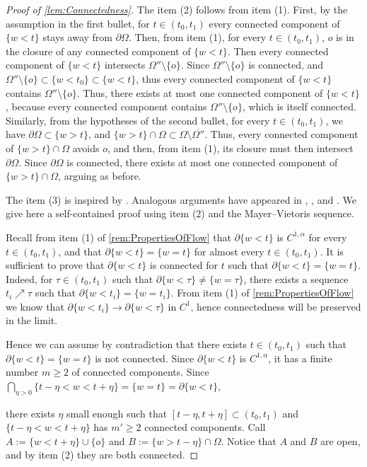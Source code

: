 \documentclass[a4paper,12pt,reqno]{amsart}
\numberwithin{equation}{section}
\theoremstyle{plain}
\theoremstyle{definition}
\theoremstyle{remark}
\begin{document}
{\begin{proof}[Proof of \cref{lem:Connectedness}]
         The item (2) follows from item (1). First, by the assumption in the first bullet, for $t \in (t_0, t_1)$ every connected component of $\{w<t\}$ stays away from $\partial\Omega$. Then, from item (1), for every $t\in (t_0,t_1)$, $o$ is in the closure of any connected component of $\{w<t\}$. Then every connected component of $\{w<t\}$ intersects $\Omega''\setminus\{o\}$. Since $\Omega''\setminus\{o\}$ is connected, and $\Omega''\setminus\{o\}\subset \{w<t_0\}\subset \{w<t\}$, thus every connected component of $\{w<t\}$ contains $\Omega''\setminus\{o\}$. Thus, there exists at most one connected component of $\{w<t\}$, because every connected component contains $\Omega''\setminus\{o\}$, which is itself connected. Similarly, from the hypotheses of the second bullet, for every $t\in (t_0,t_1)$, we have $\partial\Omega\subset\{w>t\}$, and $\{w>t\}\cap\Omega\subset\Omega\setminus\overline{\Omega''}$. Thus, every connected component of $\{w>t\}\cap\Omega$ avoids $o$, and then, from item (1), its closure must then intersect $\partial\Omega$. Since $\partial\Omega$ is connected, there exists at most one connected component of $\{w>t\}\cap\Omega$, arguing as before.

         The item (3) is inspired by \cite[Connectedness Lemma 4.2(ii)]{HuiskenIlmanen}. Analogous arguments have appeared in \cite[Lemma 2.3]{MunteanuWang}, \cite[Lemma 6.1]{JDGLiTam}, and \cite[Lemma 4.46]{LeeBook}. We give here a self-contained proof using item (2) and the Mayer--Vietoris sequence. 

        {Recall from item (1) of \cref{rem:PropertiesOfFlow} that $\partial\{w<t\}$ is $C^{1,\alpha}$ for every $t \in (t_0,t_1)$, and that $\partial \{w<t\} = \{w=t\}$ for almost every $t \in (t_0,t_1)$. It is sufficient to prove that $\partial \{w<t\}$ is connected for $t$ such that $\partial \{w<t\} = \{w=t\}$. Indeed, for $\tau \in (t_0,t_1)$ such that $\partial \{w<\tau\} \neq \{w=\tau\}$, there exists a sequence $t_i\nearrow \tau$ such that $\partial \{w<t_i\} = \{w=t_i\}$. From item (1) of \cref{rem:PropertiesOfFlow} we know that $\partial \{w < t_i\} \to \partial \{ w < \tau\}$ in $C^1$, hence connectedness will be preserved in the limit.
         
        Hence we can assume by contradiction that there exists $t\in (t_0,t_1)$ such that $\partial\{w<t\}=\{w=t\}$ is not connected.
        Since $\partial\{w<t\}$ is $C^{1,\alpha}$, it has a finite number $m\geq 2$ of connected components. Since $\bigcap_{\eta>0} \{t-\eta<w<t+\eta\} = \{w = t\} = \partial \{w < t\}$,} there exists $\eta$ small enough such that $[t-\eta,t+\eta]\subset (t_0,t_1)$ and $\{t-\eta<w<t+\eta\}$ has $m'\geq 2$ connected components. Call $A:=\{w<t+\eta\}\cup\{o\}$ and $B:=\{w>t-\eta\}\cap\Omega$. Notice that $A$ and $B$ are open, and by item (2) they are both connected.
         

\end{proof}}
\end{document}
